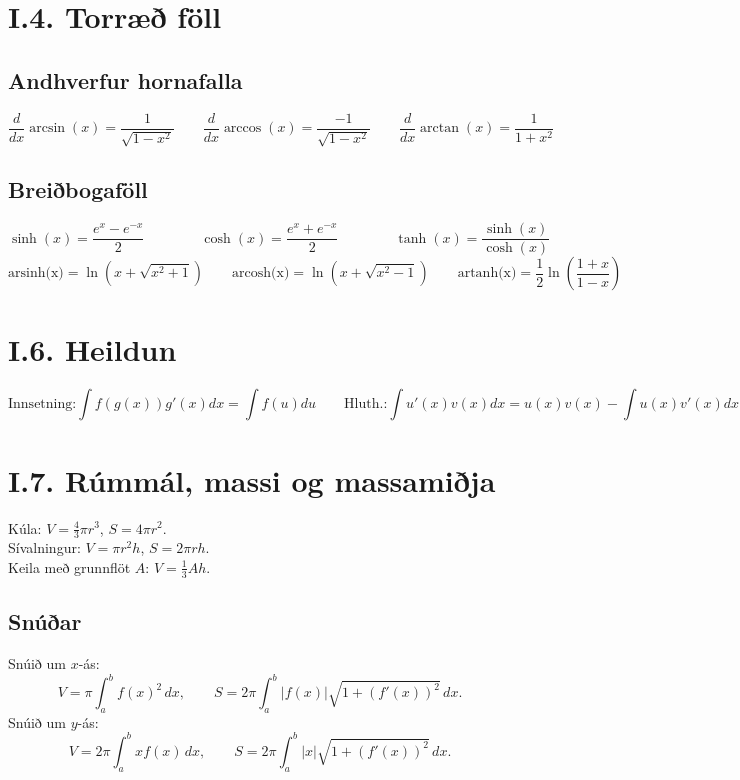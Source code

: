 \section*{I.4. Torræð föll}
\subsection*{Andhverfur hornafalla}
\[
  \frac d{dx} \arcsin(x) = \frac 1{\sqrt{1-x^2}} \qquad 
  \frac d{dx} \arccos(x) = \frac {-1}{\sqrt{1-x^2}}\qquad
  \frac d{dx} \arctan(x) = \frac 1{1+x^2}
\]


\subsection*{Breiðbogaföll}
\[
  \sinh(x) = \frac{e^x-e^{-x}}2 \qquad\qquad \cosh(x) = \frac{e^x+e^{-x}}2
  \qquad\qquad \tanh(x) = \frac {\sinh(x)}{\cosh(x)}
\]
\[
  \text{arsinh(x)} = \ln\left(x + \sqrt{x^2+1}\right) \qquad
  \text{arcosh(x)} = \ln\left(x + \sqrt{x^2-1}\right) \qquad
  \text{artanh(x)} = \frac 12\ln\left(\frac{1+x}{1-x}\right)
\]

\section*{I.6. Heildun}
\[
  \text{Innsetning:}  \int f(g(x))g'(x)dx = \int f(u)du \qquad
  \text{Hluth.:}\int u'(x)v(x)dx = u(x)v(x) -  \int u(x)v'(x)dx
\]

 
\section*{I.7. Rúmmál, massi og massamiðja}
Kúla: $V=\frac 43 \pi r^3$, $S=4\pi r^2$.\\
Sívalningur: $V=\pi r^2 h$, $S=2\pi rh$.\\
Keila með grunnflöt $A$: $V=\frac 13 Ah$.

\subsection*{Snúðar}
Snúið um $x$-ás: 
\[
  V=\pi \int_a^b f(x)^2\, dx, \qquad S= 2\pi \int_a^b |f(x)|\sqrt{1+(f'(x))^2}\, dx.
\]
Snúið um $y$-ás: 
\[
  V=2\pi \int_a^b xf(x)\, dx, \qquad S= 2\pi \int_a^b |x|\sqrt{1+(f'(x))^2}\, dx.
\]


